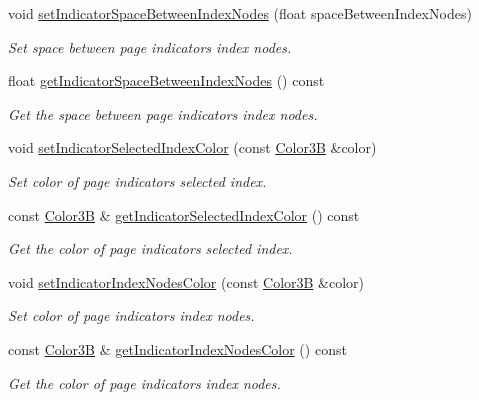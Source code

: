 \begin{DoxyCompactItemize}
void \hyperlink{classui_1_1PageView_ac181b03f26045ac2b0be91ed177d03db}{set\+Indicator\+Space\+Between\+Index\+Nodes} (float space\+Between\+Index\+Nodes)
\begin{DoxyCompactList}\small\item\em Set space between page indicator\textquotesingle{}s index nodes. \end{DoxyCompactList}\item 
float \hyperlink{classui_1_1PageView_a5ed4633cd13e1d9be2d195de1e1be077}{get\+Indicator\+Space\+Between\+Index\+Nodes} () const
\begin{DoxyCompactList}\small\item\em Get the space between page indicator\textquotesingle{}s index nodes. \end{DoxyCompactList}\item 
void \hyperlink{classui_1_1PageView_a685219b0641c33d694fa5e89fd7f0e76}{set\+Indicator\+Selected\+Index\+Color} (const \hyperlink{structColor3B}{Color3B} \&color)
\begin{DoxyCompactList}\small\item\em Set color of page indicator\textquotesingle{}s selected index. \end{DoxyCompactList}\item 
const \hyperlink{structColor3B}{Color3B} \& \hyperlink{classui_1_1PageView_ab954bc94d40d06d3639f36d224455d85}{get\+Indicator\+Selected\+Index\+Color} () const
\begin{DoxyCompactList}\small\item\em Get the color of page indicator\textquotesingle{}s selected index. \end{DoxyCompactList}\item 
void \hyperlink{classui_1_1PageView_a6fa17a26a9819a05d61e4b77dbc62ff7}{set\+Indicator\+Index\+Nodes\+Color} (const \hyperlink{structColor3B}{Color3B} \&color)
\begin{DoxyCompactList}\small\item\em Set color of page indicator\textquotesingle{}s index nodes. \end{DoxyCompactList}\item 
const \hyperlink{structColor3B}{Color3B} \& \hyperlink{classui_1_1PageView_acb97654798e343a86517ac058655cdd9}{get\+Indicator\+Index\+Nodes\+Color} () const
\begin{DoxyCompactList}\small\item\em Get the color of page indicator\textquotesingle{}s index nodes. \end{DoxyCompactList}\item 

\end{DoxyCompactItemize}
